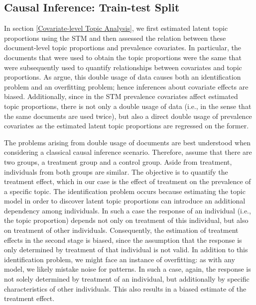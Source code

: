\subsection{Causal Inference: Train-test Split}
\label{Causal Inference: Train-test Split}

In section \ref{Covariate-level Topic Analysis}, we first estimated latent topic proportions using the STM and then assessed the relation between these document-level topic proportions and prevalence covariates. In particular, the documents that were used to obtain the topic proportions were the same that were subsequently used to quantify relationships between covariates and topic proportions. As \cite{egami2018make} argue, this double usage of data causes both an identification problem and an overfitting problem; hence inferences about covariate effects are biased. Additionally, since in the STM prevalence covariates affect estimated topic proportions, there is not only a double usage of data (i.e., in the sense that the same documents are used twice), but also a direct double usage of prevalence covariates as the estimated latent topic proportions are regressed on the former.

The problems arising from double usage of documents are best understood when considering a classical causal inference scenario. Therefore, assume that there are two groups, a treatment group and a control group. Aside from treatment, individuals from both groups are similar. The objective is to quantify the treatment effect, which in our case is the effect of treatment on the prevalence of a specific topic. The identification problem occurs because estimating the topic model in order to discover latent topic proportions can introduce an additional dependency among individuals. In such a case the response of an individual (i.e., the topic proportion) depends not only on treatment of this individual, but also on treatment of other individuals. Consequently, the estimation of treatment effects in the second stage is biased, since the assumption that the response is only determined by treatment of that individual is not valid. In addition to this identification problem, we might face an instance of overfitting: as with any model, we likely mistake noise for patterns. In such a case, again, the response is not solely determined by treatment of an individual, but additionally by specific characteristics of other individuals. This also results in a biased estimate of the treatment effect.

